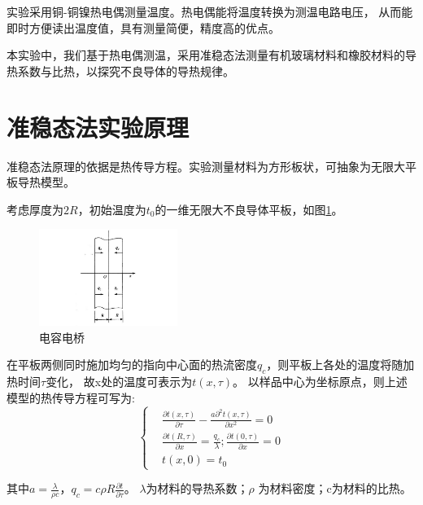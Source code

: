 \documentclass[10pt,a4paper,twocolumn,twoside,UTF8]{ctexart}
\begin{document}
实验采用铜-铜镍热电偶测量温度。热电偶能将温度转换为测温电路电压，
从而能即时方便读出温度值，具有测量简便，精度高的优点。

本实验中，我们基于热电偶测温，采用准稳态法测量有机玻璃材料和橡胶材料的导热系数与比热，以探究不良导体的导热规律。
\newpage %


\section{准稳态法实验原理\autocite{shenJiChuWuLiShiYan2015}}

    
准稳态法原理的依据是热传导方程。实验测量材料为方形板状，可抽象为无限大平板导热模型。

考虑厚度为$2R$，初始温度为$t_0$的一维无限大不良导体平板，如图\ref{fig:illus-1}。
\begin{figure}[htbp]
	\centering
	\includegraphics[width=0.4\textwidth]{attachments/illus-1.png}
	\caption{电容电桥}
	\label{fig:illus-1}
\end{figure}

在平板两侧同时施加均匀的指向中心面的热流密度$q_c$，则平板上各处的温度将随加热时间$\tau$变化，
故x处的温度可表示为$t ( x , \tau )$。
以样品中心为坐标原点，则上述模型的热传导方程可写为: 
\begin{equation}
	\left\{
	\begin{aligned}
	&\frac{\partial t ( x , \tau )}{\partial \tau} - \frac{a \partial ^2 t ( x , \tau )}{\partial x^2} = 0\\
	&\frac{\partial t ( R , \tau )}{\partial x}=\frac{q_c}{\lambda}; \frac{\partial t ( 0 , \tau )}{\partial x} = 0\\
	&t(x,0)=t_0
	\end{aligned}
	\right.
	\label{eq:1.1}
\end{equation}

其中$a=\frac{\lambda}{\rho c}$，$q_c=c \rho R\frac{\partial t}{\partial \tau}$。
$\lambda$为材料的导热系数；$\rho$ 为材料密度；c为材料的比热。
\end{document}
